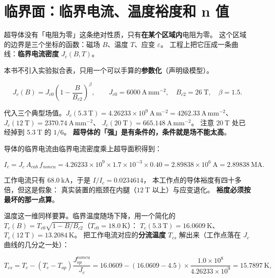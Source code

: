 \section{临界面：临界电流、温度裕度和 n 值}
\label{sec:app-am-critical}

超导体没有「电阻为零」这条绝对性质，只有\textbf{在某个区域内}电阻为零。
这个区域的边界是三个坐标的函数：磁场 $B$、温度 $T$、应变 $\varepsilon$。
工程上把它压成一条曲线：\textbf{临界电流密度} $J_c(B,T)$。

本书不引入实验拟合表，只用一个可以手算的\textbf{参数化}（声明级模型）。

\begin{equation}
J_c(B)=J_{c0}\left(1-\frac{B}{B_{c2}}\right)^{\beta},
\qquad J_{c0}=6000\ \mathrm{A\,mm^{-2}},\quad B_{c2}=26\ \mathrm{T},\quad \beta=1.5.
\label{eq:app-am-jc}
\end{equation}

代入三个典型场值。$J_c(5.3\ \mathrm{T})=4.26233\times10^{9}\ \mathrm{A\,m^{-2}}=4262.33\ \mathrm{A\,mm^{-2}}$、
$J_c(12\ \mathrm{T})=2370.74\ \mathrm{A\,mm^{-2}}$、
$J_c(20\ \mathrm{T})=665.148\ \mathrm{A\,mm^{-2}}$。
注意 $20\ \mathrm{T}$ 处已经掉到 $5.3\ \mathrm{T}$ 的 $1/6$。
\textbf{超导体的「强」是有条件的，条件就是场不能太高}。

导体的临界电流由临界电流密度乘上超导面积得到：

\begin{equation}
I_{c}=J_c\,A_{cab}\,f_{noncu}
=4.26233\times10^{9}\times1.7\times10^{-3}\times0.40
=2.89838\times10^{6}\ \mathrm{A}=2.89838\ \mathrm{MA}.
\label{eq:app-am-ic}
\end{equation}

工作电流只有 $68.0\ \mathrm{kA}$，于是 $I/I_c=0.0234614$，
本工作点的导体裕度有四十多倍，但这是假象：
真实装置的瓶颈在内腿（$12\ \mathrm{T}$ 以上）与应变退化。
\textbf{裕度必须按最坏的那一点算}。

温度这一维同样要算。临界温度随场下降，用一个简化的
$T_c(B)=T_{c0}\sqrt{1-B/B_{c2}}$（$T_{c0}=18.0\ \mathrm{K}$）：
$T_c(5.3\ \mathrm{T})=16.0609\ \mathrm{K}$、$T_c(12\ \mathrm{T})=13.2084\ \mathrm{K}$。
把工作电流对应的\textbf{分流温度} $T_{cs}$ 解出来（工作点落在 $J_c$ 曲线的几分之一处）：

\begin{equation}
T_{cs}=T_c-\left(T_c-T_{op}\right)\frac{J_{op}^{noncu}}{J_c}
=16.0609-\left(16.0609-4.5\right)\times\frac{1.0\times10^{8}}{4.26233\times10^{9}}
=15.7897\ \mathrm{K},
\label{eq:app-am-tcs}
\end{equation}

